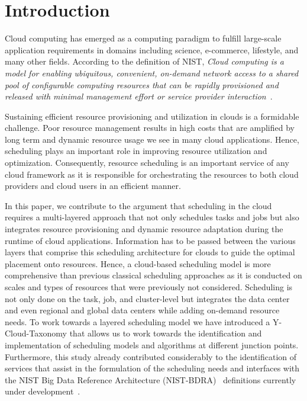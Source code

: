 \documentclass[final,5p,times,twocolumn]{elsarticle}
\begin{document}
\section{Introduction}

Cloud computing has emerged as a computing paradigm to fulfill large-scale application requirements in domains including science, e-commerce, lifestyle, and many other fields. According to the definition of NIST, {\em Cloud computing is a model for enabling ubiquitous, convenient, on-demand network access to a shared pool of configurable computing resources that can be rapidly provisioned and released with minimal management effort or service provider interaction}~\cite{mell2011nist}.

Sustaining efficient resource provisioning and utilization in clouds is a formidable challenge. Poor resource management results in high costs that are amplified by long term and dynamic resource usage we see in many cloud applications. Hence, scheduling plays an important role in improving resource utilization and optimization. Consequently, resource scheduling is an important service of any cloud framework as it is responsible for orchestrating the resources to both cloud providers and cloud users in an efficient manner.

In this paper, we contribute to the argument that scheduling in the cloud requires a multi-layered approach that not only schedules tasks and jobs but also integrates resource provisioning and dynamic resource adaptation during the runtime of cloud applications. Information has to be passed between the various layers that comprise this scheduling architecture for clouds to guide the optimal placement onto resources. Hence, a cloud-based scheduling model is more comprehensive than previous classical scheduling approaches as it is conducted on scales and types of resources that were previously not considered. Scheduling is not only done on the task, job, and cluster-level but integrates the data center and even regional and global data centers while adding on-demand resource needs. To work towards a layered scheduling model we have introduced a Y-Cloud-Taxonomy that allows us to work towards the identification and implementation of scheduling models and algorithms at different junction points. Furthermore, this study already contributed considerably to the identification of services that assist in the formulation of the scheduling needs and interfaces with the NIST Big Data Reference Architecture (NIST-BDRA)~\cite{nist-bdra-vol6} definitions currently under development~\cite{nist-bdra-vol8}.
\end{document}
